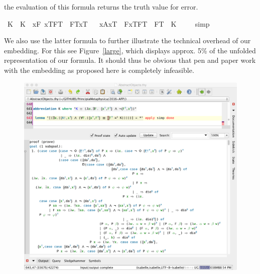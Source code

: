 \begin{isabellebody}
\begin{isamarkuptext}
  the evaluation of this formula returns the  truth value for error.%
\end{isamarkuptext}\isamarkuptrue%
\isamarkupfalse%
\ K\ \ {\isachardoublequoteopen}K\ {\isasymequiv}\ {\isacharparenleft}\isactrlbold {\isasymlambda}x{\isachardot}\isactrlbold {\isasymexists}F{\isachardot}\ {\isasymlbrace}x\isactrlsup T{\isacharcomma}F\isactrlsup T{\isasymrbrace}\ \isactrlbold {\isasymand}\ \isactrlbold {\isasymnot}{\isasymlparr}F\isactrlsup T{\isacharcomma}x\isactrlsup T{\isasymrparr}{\isacharparenright}{\isachardoublequoteclose}\isanewline
\isanewline
\ \isamarkupfalse%
\ {\isachardoublequoteopen}{\isacharbrackleft}{\isacharparenleft}\isactrlbold {\isasymexists}x{\isachardot}{\isacharparenleft}{\isasymlparr}A{\isacharbang}{\isacharcomma}x\isactrlsup T{\isasymrparr}\ \isactrlbold {\isasymand}\ {\isacharparenleft}\isactrlbold {\isasymforall}F{\isachardot}{\isacharparenleft}{\isasymlbrace}x\isactrlsup T{\isacharcomma}F\isactrlsup T{\isasymrbrace}\ \isactrlbold {\isasymequiv}\ {\isacharparenleft}F\isactrlsup T\ \isactrlbold {\isacharequal}\ K{\isacharparenright}{\isacharparenright}{\isacharparenright}{\isacharparenright}{\isacharparenright}{\isacharbrackright}\ {\isacharequal}\ {\isacharasterisk}{\isachardoublequoteclose}%
\isadelimproof
\ %
\endisadelimproof
%
\isatagproof
{}\isamarkupfalse%
\ simp\ \isamarkupfalse%
%
\endisatagproof
{\isafoldproof}%
%
\isadelimproof
%
\endisadelimproof
%
\begin{isamarkuptext}%
We also use the latter formula to further illustrate the technical overhead of our embedding. 
 For this see Figure~\ref{large}, which displays approx. 5\% of the unfolded representation of our 
 formula. It should thus be obvious that pen and paper work with the embedding as proposed here 
 is completely infeasible. 
   \begin{figure}[t] \centering
  \includegraphics[width=.9\textwidth]{LargeTerm.png}

\end{figure}
\end{isamarkuptext}
\end{isabellebody}
